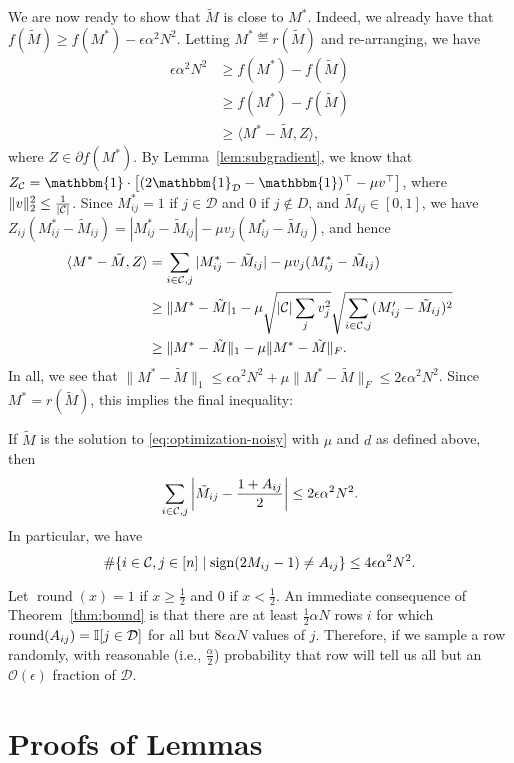 \documentclass[11pt]{article}
\newcommand{\M}{\tilde{M}}
\newcommand{\Mm}{M^*}
\newcommand{\sD}{\mathcal{D}}
\newcommand{\oo}{\mathcal{O}}
\newcommand{\bi}{\mathbbm{1}}
\DeclareMathOperator{\round}{round}
\begin{document}
We are now ready to show that $\M$ is close to $M^*$. Indeed, we already 
have that $f(\M) \geq f(M^*) - \epsilon \alpha^2 N^2$. Letting $\Mm \eqdef r(\M)$ 
and re-arranging, we have
\begin{align}
\epsilon \alpha^2 N^2 &\geq f(M^*) - f(\M) \\
 &\geq f(\Mm) - f(\M) \\
 &\geq \langle \Mm - \M, Z \rangle,
\end{align}
where $Z \in \partial f(\Mm)$.
By Lemma~\ref{lem:subgradient}, we know that $Z_{\sC} = \bi \cdot \left[(2\bi_{\sD}-\bi)^{\top} - \mu v^{\top}\right]$, 
where $\|v\|_2^2 \leq \frac{1}{|\mathcal{C}|}$. Since $\Mm_{ij} = 1$ if $j \in \sD$ and $0$ if $j \not\in D$, and 
$\M_{ij} \in [0,1]$, we have $Z_{ij}(\Mm_{ij}-\M_{ij}) = |\Mm_{ij} - \M_{ij}| - \mu v_j(\Mm_{ij}-\M_{ij})$, and hence
\begin{align}
\langle \Mm - \M, Z \rangle &= \sum_{i \in \sC, j} |\Mm_{ij} - \M_{ij}| - \mu v_j (\Mm_{ij} - \M_{ij}) \\
 &\geq \|\Mm-\M|_1 - \mu \sqrt{|\sC|\sum_j v_j^2}\sqrt{\sum_{i \in \sC, j} (M_{ij}'-\M_{ij})^2} \\
 &\geq \|\Mm-\M\|_1 - \mu \|\Mm - \M\|_F.
\end{align}
In all, we see that $\|\Mm-\M\|_1 \leq \epsilon \alpha^2 N^2 + \mu \|\Mm - \M\|_F \leq 2\epsilon \alpha^2 N^2$.
Since $\Mm = r(\M)$, this implies the final inequality:
\begin{theorem}
\label{thm:bound}
If $\M$ is the solution to \eqref{eq:optimization-noisy} with $\mu$ and $d$ as defined 
above, then
\[ \sum_{i \in \sC, j} \left|\M_{ij} - \frac{1+A_{ij}}{2}\right| \leq 2\epsilon\alpha^2N^2. \]
In particular, we have
\[ \#\{i \in \mathcal{C}, j \in [n] \mid \operatorname{sign}(2M_{ij}-1) \neq A_{ij}\} \leq 4\epsilon\alpha^2N^2. \]
\end{theorem}
Let $\round(x) = 1$ if $x \geq \frac{1}{2}$ and $0$ if $x < \frac{1}{2}$. An immediate consequence 
of Theorem~\ref{thm:bound} is that 
there are at least $\frac{1}{2}\alpha N$ rows $i$ for which $\round(A_{ij}) = \bI[j \in \sD]$ 
for all but $8\epsilon \alpha N$ values of $j$. Therefore, if we sample a row randomly, with 
reasonable (i.e., $\frac{\alpha}{2}$) probability that row will tell us all but an $\oo(\epsilon)$ fraction of $\sD$.

\section{Proofs of Lemmas}
\label{sec:lemma-proofs}
\end{document}
